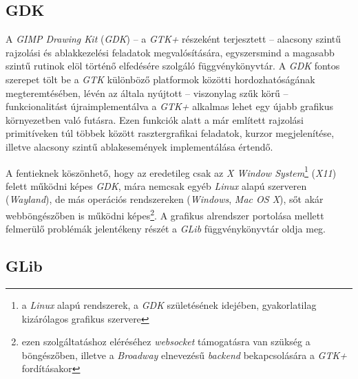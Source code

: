 \subsection{GDK}
\label{sec:gdk}

A \textit{GIMP Drawing Kit} (\textit{GDK}) -- a \textit{GTK+} részeként terjesztett -- alacsony szintű rajzolási és ablakkezelési feladatok megvalósítására, egyszersmind a magasabb szintű rutinok elöl történő elfedésére szolgáló függvénykönyvtár. A \textit{GDK }fontos szerepet tölt be a \textit{GTK} különböző platformok közötti hordozhatóságának megteremtésében, lévén az általa nyújtott -- viszonylag szűk körű -- funkcionalitást újraimplementálva a \textit{GTK+} alkalmas lehet egy újabb grafikus környezetben való futásra. Ezen funkciók alatt a már említett rajzolási primitíveken túl többek között rasztergrafikai feladatok, kurzor megjelenítése, illetve alacsony szintű ablakesemények implementálása értendő.

A fentieknek köszönhető, hogy az eredetileg csak az \textit{X Window System}\footnote{a \textit{Linux} alapú rendszerek, a \textit{GDK} születésének idejében, gyakorlatilag kizárólagos grafikus szervere} (\textit{X11}) felett működni képes \textit{GDK}, mára nemcsak egyéb \textit{Linux} alapú szerveren (\textit{Wayland}), de más operációs rendszereken (\textit{Windows}, \textit{Mac OS X}), sőt akár webböngészőben is működni képes\footnote{ezen szolgáltatáshoz eléréséhez \textit{websocket} támogatásra van szükség a böngészőben, illetve a \textit{Broadway} elnevezésű \textit{backend} bekapcsolására a \textit{GTK+} fordításakor}. A grafikus alrendszer portolása mellett felmerülő problémák jelentékeny részét a \textit{GLib} függvénykönyvtár oldja meg.

\subsection{GLib}

